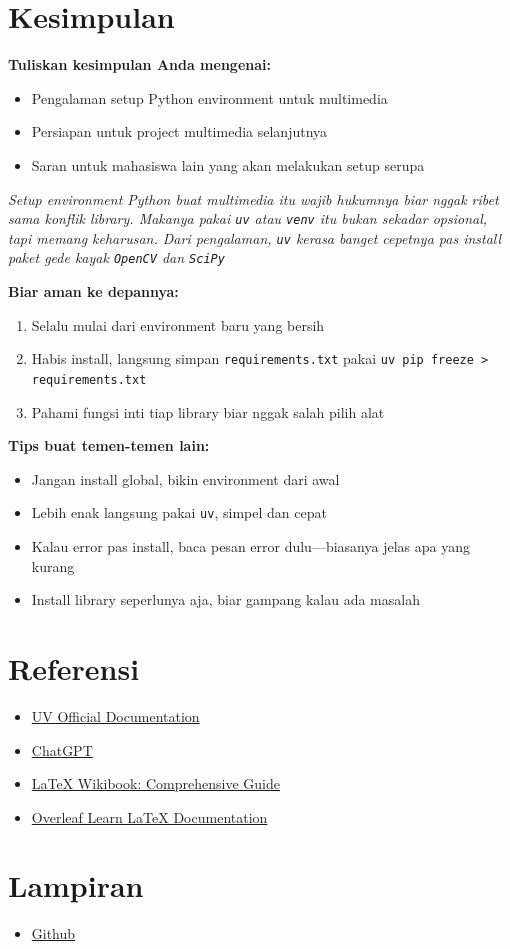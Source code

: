 \documentclass[11pt,a4paper]{article}
\begin{document}
\section{Kesimpulan}
\textbf{Tuliskan kesimpulan Anda mengenai:}
\begin{itemize}
    \item Pengalaman setup Python environment untuk multimedia
    \item Persiapan untuk project multimedia selanjutnya
    \item Saran untuk mahasiswa lain yang akan melakukan setup serupa
\end{itemize}

\textit{
Setup environment Python buat multimedia itu wajib hukumnya biar nggak ribet sama konflik library. Makanya pakai \texttt{uv} atau \texttt{venv} itu bukan sekadar opsional, tapi memang keharusan. Dari pengalaman, \texttt{uv} kerasa banget cepetnya pas install paket gede kayak \texttt{OpenCV} dan \texttt{SciPy}}

\textbf{Biar aman ke depannya:}
\begin{enumerate}
    \item Selalu mulai dari environment baru yang bersih
    \item Habis install, langsung simpan \texttt{requirements.txt} pakai \texttt{uv pip freeze > requirements.txt}
    \item Pahami fungsi inti tiap library biar nggak salah pilih alat
\end{enumerate}

\textbf{Tips buat temen-temen lain:}
\begin{itemize}
    \item Jangan install global, bikin environment dari awal
    \item Lebih enak langsung pakai \texttt{uv}, simpel dan cepat
    \item Kalau error pas install, baca pesan error dulu—biasanya jelas apa yang kurang
    \item Install library seperlunya aja, biar gampang kalau ada masalah
\end{itemize}



\section{Referensi}
\begin{itemize}
    \item \href{https://docs.astral.sh/uv/}{UV Official Documentation}
    \item \href{https://chatgpt.com/share/68adcaac-f580-8006-bc89-1113529dff4d}{ChatGPT}
    \item \href{https://en.wikibooks.org/wiki/LaTeX}{LaTeX Wikibook: Comprehensive Guide}
    \item \href{https://www.overleaf.com/learn}{Overleaf Learn LaTeX Documentation}
\end{itemize}

\section{Lampiran}
\begin{itemize}
    \item \href{https://github.com/pataanggs/Sistem-Teknologi-Multimedia/tree/main/Worksheet%201}{Github}
\end{itemize}
\end{document}
